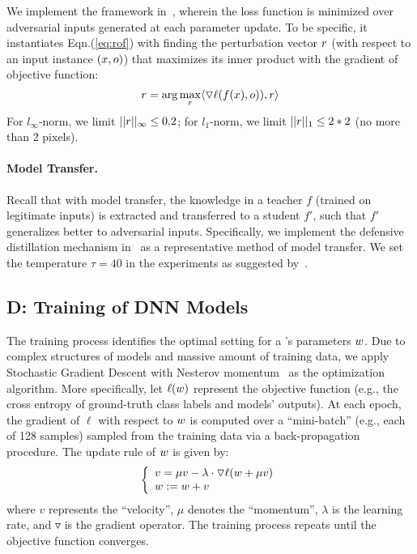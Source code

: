 We implement the framework in~\cite{Shaham:2015:arxiv}, wherein the loss function is minimized over adversarial inputs generated at each parameter update. To be specific, it instantiates Eqn.\;(\ref{eq:rof}) with finding the perturbation vector $r$ (with respect to an input instance $(x, o)$) that maximizes its inner product with the gradient of objective function:
\begin{equation}
    \label{eq:rof2}
    r = \arg\max_{r} \langle \triangledown \ell (f(x), o)), r \rangle
\end{equation}
For $l_\infty$-norm, we limit $||r||_\infty \leq 0.2$; for $l_1$-norm, we limit $||r||_1 \leq 2*2$ (no more than 2 pixels).


\paragraph*{Model Transfer.\;} Recall that with model transfer, the knowledge in a teacher \dnn $f$ (trained on legitimate inputs) is extracted and transferred to a student \dnn $f'$, such that $f'$ generalizes better to adversarial inputs. Specifically, we implement the defensive distillation mechanism in~\cite{Papernot:2016:sp} as a representative method of model transfer. We set the temperature $\tau = 40$ in the experiments as suggested by~\cite{Papernot:2016:sp}.



\subsection*{D: Training of DNN Models}

The training process identifies the optimal setting for a \dnn's parameters $w$. Due to complex structures of \dnn models and massive amount of training data,
we apply Stochastic Gradient Descent with Nesterov momentum~\cite{Sutskever:2013:icml} as the optimization algorithm. More specifically, let $\ell(w)$ represent the objective function (e.g., the cross entropy of ground-truth class labels and \dnn models' outputs). At each epoch, the gradient of $\ell$ with respect to $w$ is computed over a ``mini-batch'' (e.g., each of 128 samples) sampled from the training data via a back-propagation procedure. The update rule of $w$ is given by:
\begin{equation*}
\left\{
\begin{array}{l}
v = \mu v -\lambda \cdot \triangledown \ell(w + \mu v)\\
w := w + v
\end{array}
\right.
\end{equation*}
where $v$ represents the ``velocity'', $\mu$ denotes the ``momentum'', $\lambda$ is the learning rate, and $\triangledown$ is the gradient operator. The training process repeats until the objective function converges.

